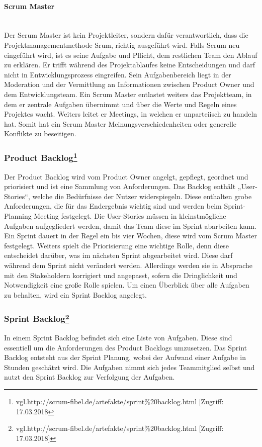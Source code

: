 \paragraph{Scrum Master}
\leavevmode \\
Der Scrum Master ist kein Projektleiter, sondern dafür verantwortlich, dass die Projektmanagementmethode Srum, richtig ausgeführt wird. Falls Scrum neu eingeführt wird, ist es seine Aufgabe und Pflicht, dem restlichen Team den Ablauf zu erklären. Er trifft während des Projektablaufes keine Entscheidungen und darf nicht in Entwicklungsprozess eingreifen. Sein Aufgabenbereich liegt in der Moderation und der Vermittlung an Informationen zwischen Product Owner und dem Entwicklungsteam. Ein Scrum Master entlastet weiters das Projektteam, in dem er zentrale Aufgaben übernimmt und über die Werte und Regeln eines Projektes wacht. Weiters leitet er Meetings, in welchen er unparteiisch zu handeln hat. Somit hat ein Scrum Master Meinungsverschiedenheiten oder generelle Konflikte zu beseitigen. 

\subsubsection[Product Backlog]{Product Backlog\protect\footnote{\label{foot:2}vgl.http://scrum-fibel.de/artefakte/sprint\%20backlog.html [Zugriff: 17.03.2018}}
Der Product Backlog wird vom Product Owner angelgt, gepflegt, geordnet und priorisiert und ist eine Sammlung von Anforderungen. Das Backlog enthält „User-Stories“, welche die Bedürfnisse der Nutzer widerspiegeln. Diese enthalten grobe Anforderungen, die für das Endergebnis wichtig sind und werden beim Sprint-Planning Meeting festgelegt. Die User-Stories müssen in kleinstmögliche Aufgaben aufgegliedert werden, damit das Team diese im Sprint abarbeiten kann. Ein Sprint dauert in der Regel ein bis vier Wochen, diese wird vom Scrum Master festgelegt. Weiters spielt die Priorisierung eine wichtige Rolle, denn diese entscheidet darüber, was im nächsten Sprint abgearbeitet wird. Diese darf während dem Sprint nicht verändert werden. Allerdings werden sie in Absprache mit den Stakeholdern korrigiert und angepasst, sofern die Dringlichkeit und Notwendigkeit eine große Rolle spielen. Um einen Überblick über alle Aufgaben zu behalten, wird ein Sprint Backlog angelegt. 

\subsubsection[Sprint Backlog]{Sprint Backlog\protect\footnote{\label{foot:2}vgl.http://scrum-fibel.de/artefakte/sprint\%20backlog.html [Zugriff: 17.03.2018]}}
In einem Sprint Backlog befindet sich eine Liste von Aufgaben. Diese sind essentiell um die Anforderungen des Product Backlogs umzusetzen. Das Sprint Backlog entsteht aus der Sprint Planung, wobei der Aufwand einer Aufgabe in Stunden geschätzt wird. Die Aufgaben nimmt sich jedes Teammitglied selbst und nutzt den Sprint Backlog zur Verfolgung der Aufgaben. 

